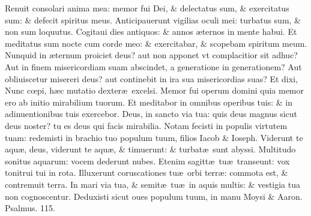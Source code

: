 \documentclass[a5paper,10pt]{book}
\def\ae{æ}
\def\oe{œ}
\begin{document}
\begin{multicols*}{2}
\newline \color{red} R\color{black}enuit consolari anima mea: memor fui Dei, \& delectatus sum, \& exercitatus sum: \& defecit spiritus meus.
\newline \color{red} A\color{black}nticipauerunt vigilias oculi mei: turbatus sum, \& non sum loquutus.
\newline \color{red} C\color{black}ogitaui dies antiquos: \& annos \ae ternos in mente habui.
\newline \color{red} E\color{black}t meditatus sum nocte cum corde meo: \& exercitabar, \& scopebam spiritum meum.
\newline \color{red} N\color{black}unquid in \ae ternum proiciet deus? aut non apponet vt complacitior sit adhuc?
\newline \color{red} A\color{black}ut in finem misericordiam suam abscindet, a generatione in generationem?
\newline \color{red} A\color{black}ut obliuiscetur misereri deus? aut continebit in ira sua misericordias suas?
\newline \color{red} E\color{black}t dixi, Nunc c\oe pi, h\ae c mutatio dexter\ae \ excelsi.
\newline \color{red} M\color{black}emor fui operum domini quia memor ero ab initio mirabilium tuorum.
\newline \color{red} E\color{black}t meditabor in omnibus operibus tuis: \& in adinuentionibus tuis exercebor.
\newline \color{red} D\color{black}eus, in sancto via tua: quis deus magnus sicut deus noster? tu es deus qui facis mirabilia.
\newline \color{red} N\color{black}otam fecisti in populis virtutem tuam: redemisti in brachio tuo populum tuum, filios Iacob \& Ioseph.
\newline \color{red} V\color{black}iderunt te aqu\ae , deus, viderunt te aqu\ae , \& timuerunt: \& turbat\ae \ sunt abyssi.
\newline \color{red} M\color{black}ultitudo sonitus aquarum: vocem dederunt nubes.
\newline \color{red} E\color{black}tenim sagitt\ae \ tu\ae \ transeunt: vox tonitrui tui in rota.
\newline \color{red} I\color{black}lluxerunt coruscationes tu\ae \ orbi terr\ae : commota est, \& contremuit terra.
\newline \color{red} I\color{black}n mari via tua, \& semit\ae \ tu\ae \ in aquis multis: \& vestigia tua non cognoscentur.
\newline \color{red} D\color{black}eduxisti sicut oues populum tuum, in manu Moysi \& Aaron. \color{red} Psalmus. \hypertarget{ps115}{115.} \color{black}

\end{multicols*}
\end{document}
